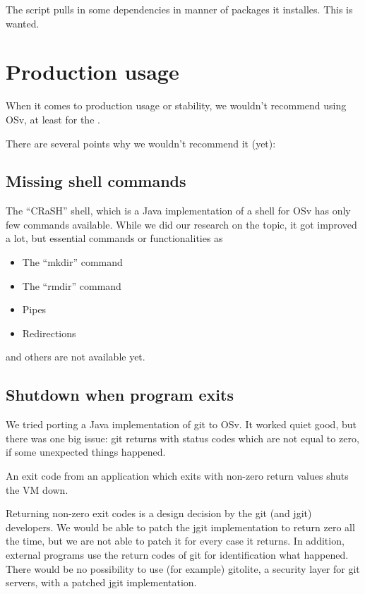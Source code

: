     The script pulls in some dependencies in manner of packages it installes.
    This is wanted.

\chapter{Production usage}

    When it comes to production usage or stability, we wouldn't recommend using
    OSv, at least for the \HFU.

    There are several points why we wouldn't recommend it (yet):

    \section{Missing shell commands}

        The ``CRaSH'' shell, which is a Java implementation of a shell for OSv
        has only few commands available. While we did our research on the topic,
        it got improved a lot, but essential commands or functionalities as

            \begin{itemize}
                \item The ``mkdir'' command
                \item The ``rmdir'' command
                \item Pipes
                \item Redirections
            \end{itemize}

        and others are not available yet.

    \section{Shutdown when program exits}

        We tried porting a Java implementation of git to OSv. It worked quiet
        good, but there was one big issue: git returns with status codes which
        are not equal to zero, if some unexpected things happened.

        An exit code from an application which exits with non-zero return values
        shuts the VM down.

        Returning non-zero exit codes is a design decision by the git (and jgit)
        developers. We would be
        able to patch the jgit implementation to return zero all the time, but
        we are not able to patch it for every case it returns. In addition,
        external programs use the return codes of git for identification what
        happened. There would be no possibility to use (for example) gitolite, a
        security layer for git servers, with a patched jgit implementation.

